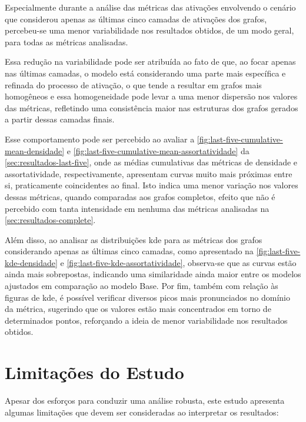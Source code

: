 Especialmente durante a análise das métricas das ativações envolvendo o cenário que considerou apenas as últimas cinco camadas de ativações dos grafos, percebeu-se uma menor variabilidade nos resultados obtidos, de um modo geral, para todas as métricas analisadas.

Essa redução na variabilidade pode ser atribuída ao fato de que, ao focar apenas nas últimas camadas, o modelo está considerando uma parte mais específica e refinada do processo de ativação, o que tende a resultar em grafos mais homogêneos e essa homogeneidade pode levar a uma menor dispersão nos valores das métricas, refletindo uma consistência maior nas estruturas dos grafos gerados a partir dessas camadas finais.

Esse comportamento pode ser percebido ao avaliar a \autoref{fig:last-five-cumulative-mean-densidade} e \autoref{fig:last-five-cumulative-mean-assortatividade} da \autoref{sec:resultados-last-five}, onde as médias cumulativas das métricas de densidade e assortatividade, respectivamente, apresentam curvas muito mais próximas entre si, praticamente coincidentes ao final. Isto indica uma menor variação nos valores dessas métricas, quando comparadas aos grafos completos, efeito que não é percebido com tanta intensidade em nenhuma das métricas analisadas na \autoref{sec:resultados-complete}.

Além disso, ao analisar as distribuições \gls{kde} para as métricas dos grafos considerando apenas as últimas cinco camadas, como apresentado na \autoref{fig:last-five-kde-densidade} e \autoref{fig:last-five-kde-assortatividade}, observa-se que as curvas estão ainda mais sobrepostas, indicando uma similaridade ainda maior entre os modelos ajustados em comparação ao modelo Base. Por fim, também com relação às figuras de \gls{kde}, é possível verificar diversos picos mais pronunciados no domínio da métrica, sugerindo que os valores estão mais concentrados em torno de determinados pontos, reforçando a ideia de menor variabilidade nos resultados obtidos.

\section{Limitações do Estudo}

Apesar dos esforços para conduzir uma análise robusta, este estudo apresenta algumas limitações que devem ser consideradas ao interpretar os resultados:

